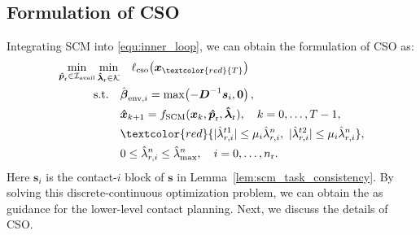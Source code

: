 \subsection{Formulation of CSO}\label{sec:cs_opt}

Integrating SCM into \eqref{equ:inner_loop}, we can obtain the formulation of CSO as:
\begin{equation}
\begin{aligned}
\min_{\boldsymbol{\hat{p}}_{\text{r}} \in \mathcal{I}_{\text{avail}}}\min_{\boldsymbol{\hat{\lambda}}_{\text{r}} \in \mathcal{K}} & \quad
\ell_{\text{cso}}\big(\boldsymbol{x}_{\textcolor{red}{T}}\big) \\
\text{s.t.} \quad
& \hat{\boldsymbol{\beta}}_{\mathrm{env},i}
=\max\!\left(-\boldsymbol{D}^{-1}\boldsymbol{s}_i,\boldsymbol{0}\right),\\
& \boldsymbol{\hat{x}}_{k+1}
= f_{\text{SCM}}(\boldsymbol{x}_k, \boldsymbol{\hat{p}}_{\text{r}}, \boldsymbol{\hat{\lambda}}_{\text{r}}),
\quad k = 0, \dots, T-1, \\
& \textcolor{red}{|\hat{\lambda}_{r,i}^{t1}|\leq\mu_i\hat{\lambda}_{r,i}^{n} , \ |\hat{\lambda}_{r,i}^{t2}|\leq\mu_i\hat{\lambda}_{r,i}^{n}}, \\
& 0 \le \hat{\lambda}^n_{r,i} \le \hat{\lambda}^n_{\text{max}}, \quad i = 0, \dots, n_{\text{r}}.
\end{aligned}\label{equ:csqp}
\end{equation}
Here $\boldsymbol{s}_i$ is the contact-$i$ block of $\boldsymbol{s}$ in Lemma~\ref{lem:scm_task_consistency}. By solving this discrete-continuous optimization problem, we can obtain the  as guidance for the lower-level contact planning. Next, we discuss the details of CSO.
